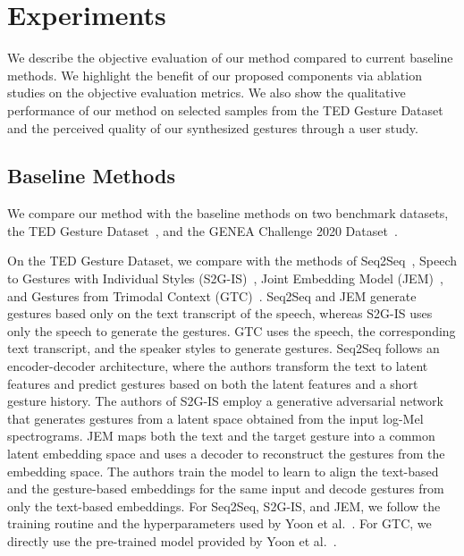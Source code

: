 \documentclass[conference,compsoc]{IEEEtran}
\theoremstyle{definition}
\begin{document}
\section{Experiments}
We describe the objective evaluation of our method compared to current baseline methods. We highlight the benefit of our proposed components via ablation studies on the objective evaluation metrics. We also show the qualitative performance of our method on selected samples from the TED Gesture Dataset~\cite{cospeech_gestures} and the perceived quality of our synthesized gestures through a user study.
\subsection{Baseline Methods}
We compare our method with the baseline methods on two benchmark datasets, the TED Gesture Dataset~\cite{cospeech_gestures}, and the GENEA Challenge 2020 Dataset~\cite{genea_2020,genea_2021}.

On the TED Gesture Dataset, we compare with the methods of Seq2Seq~\cite{cospeech_gestures}, Speech to Gestures with Individual Styles (S2G-IS)~\cite{individual_gesture_styles}, Joint Embedding Model (JEM)~\cite{language2pose}, and Gestures from Trimodal Context (GTC)~\cite{trimodal}. Seq2Seq and JEM generate gestures based only on the text transcript of the speech, whereas S2G-IS uses only the speech to generate the gestures. GTC uses the speech, the corresponding text transcript, and the speaker styles to generate gestures. Seq2Seq follows an encoder-decoder architecture, where the authors transform the text to latent features and predict gestures based on both the latent features and a short gesture history. The authors of S2G-IS employ a generative adversarial network that generates gestures from a latent space obtained from the input log-Mel spectrograms. JEM maps both the text and the target gesture into a common latent embedding space and uses a decoder to reconstruct the gestures from the embedding space. The authors train the model to learn to align the text-based and the gesture-based embeddings for the same input and decode gestures from only the text-based embeddings. For Seq2Seq, S2G-IS, and JEM, we follow the training routine and the hyperparameters used by Yoon et al.~\cite{trimodal}. For GTC, we directly use the pre-trained model provided by Yoon et al.~\cite{trimodal}.
\end{document}
